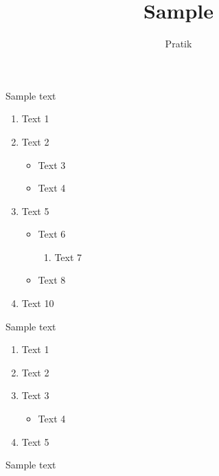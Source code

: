 \documentclass[12pt]{article}
\begin{document}
\title{Sample}
\author{Pratik}\maketitle

Sample text

\begin{enumerate}
\item Text 1
\item Text 2
\begin{itemize}
\item Text 3
\item Text 4
\end{itemize}
\item Text 5
\begin{itemize}
\item Text 6
\begin{enumerate}
\item Text 7
\end{enumerate}
\item Text 8
\end{itemize}
\item Text 10
\end{enumerate}

Sample text

\begin{enumerate}
\item Text 1
\item Text 2
\item Text 3
\begin{itemize}
\item Text 4
\end{itemize}
\item Text 5
\end{enumerate}

Sample text
\end{document}
